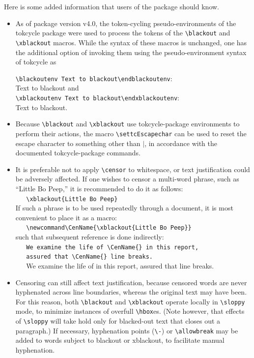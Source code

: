 \documentclass{article}
\begin{document}
Here is some added information that users of the package should know.

\begin{itemize}

\item As of package version v4.0, the token-cycling pseudo-environments of the
  \textsf{tokcycle} package were used to process the tokens of 
  the \verb|\blackout| and \verb|\xblackout| macros.
While the syntax of these macros is unchanged, one has the additional
  option of invoking them using the pseudo-environment syntax of
  \textsf{tokcycle} as

\verb|\blackoutenv Text to blackout\endblackoutenv|:\\
\blackoutenv Text to blackout\endblackoutenv{} and\\
\verb|\xblackoutenv Text to blackout\endxblackoutenv|:\\
\xblackoutenv Text to blackout\endxblackoutenv.

\item Because \verb|\blackout| and \verb|\xblackout| use 
  tokcycle-package environments to perform their actions, the
  macro \verb|\settcEscapechar| can be used to reset the escape 
  character to something other than $|$, in accordance with 
  the documented \textsf{tokcycle}-package commands.


\item It is preferable not to apply \verb|\censor| to whitespace, or text
justification could be adversely affected.  If one wishes to censor a
multi-word phrase, such as ``Little Bo Peep,'' it is recommended to do
it as follows:\\
\verb|   \xblackout{Little Bo Peep}|\\
If such a phrase is to be used repeatedly through a document, 
it is most convenient to place it as a macro:\\
\verb|   \newcommand\CenName{\xblackout{Little Bo Peep}}|\\
such that subsequent reference is done indirectly:\\
\verb|   We examine the life of \CenName{} in this report,|\\
\verb|   assured that \CenName{} line breaks.|\\
\newcommand\CenName{\xblackout{Little Bo Peep}}
\verb|   |We examine the life of \CenName{} in this report, assured that 
  \CenName{} line breaks.

\item Censoring can still affect text justification, because 
  censored words are never hyphenated across line
  boundaries, whereas the original text may have been.
For this reason, both \verb|\blackout| and \verb|\xblackout|
  operate locally in \verb|\sloppy| mode, to minimize instances
  of overfull \verb|\hbox|es.
(Note however, that effects of \verb|\sloppy| will take hold only
  for blacked-out text that closes out a paragraph.)
If necessary, hyphenation points (\verb|\-|) or 
  \verb|\allowbreak| may be added to words subject to blackout 
  or xblackout, to facilitate manual hyphenation.


\end{itemize}
\end{document}
